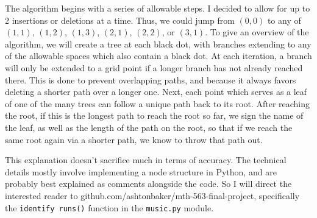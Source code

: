 \documentclass{article}
\begin{document}
The algorithm begins with a series of allowable steps. I decided to allow for up to 2 insertions or deletions at a time. Thus, we could jump from \((0, 0)\) to any of \((1, 1)\), \((1, 2)\), \((1, 3)\), \((2, 1)\), \((2, 2)\), or \((3, 1)\). To give an overview of the algorithm, we will create a tree at each black dot, with branches extending to any of the allowable spaces which also contain a black dot. At each iteration, a branch will only be extended to a grid point if a longer branch has not already reached there. This is done to prevent overlapping paths, and because it always favors deleting a shorter path over a longer one. Next, each point which serves as a leaf of one of the many trees can follow a unique path back to its root. After reaching the root, if this is the longest path to reach the root so far, we sign the name of the leaf, as well as the length of the path on the root, so that if we reach the same root again via a shorter path, we know to throw that path out.

This explanation doesn't sacrifice much in terms of accuracy. The technical details mostly involve implementing a node structure in Python, and are probably best explained as comments alongside the code. So I will direct the interested reader to github.com/ashtonbaker/mth-563-final-project, specifically the \texttt{identify runs()} function in the \texttt{music.py} module.
\end{document}

